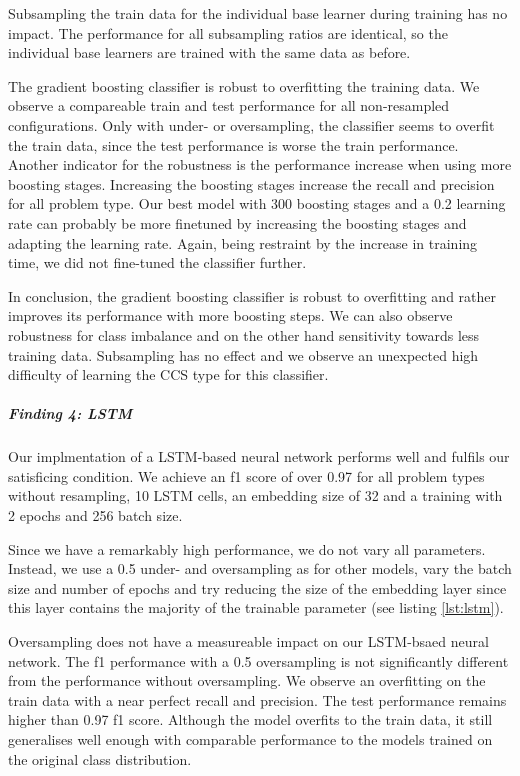 Subsampling the train data for the individual base learner during training has no impact. The performance for all subsampling ratios are identical, so the individual base learners are trained with the same data as before.

The gradient boosting classifier is robust to overfitting the training data. We observe a compareable train and test performance for all non-resampled configurations. Only with under- or oversampling, the classifier seems to overfit the train data, since the test performance is worse the train performance. 
Another indicator for the robustness is the performance increase when using more boosting stages. Increasing the boosting stages increase the recall and precision for all problem type. Our best model with 300 boosting stages and a 0.2 learning rate can probably be more finetuned by increasing the boosting stages and adapting the learning rate. Again, being restraint by the increase in training time, we did not fine-tuned the classifier further.

In conclusion, the gradient boosting classifier is robust to overfitting and rather improves its performance with more boosting steps. We can also observe robustness for class imbalance and on the other hand sensitivity towards less training data. Subsampling has no effect and we observe an unexpected high difficulty of learning the CCS type for this classifier.


\subparagraph{Finding 4: LSTM}
Our implmentation of a LSTM-based neural network performs well and fulfils our satisficing condition. We achieve an f1 score of over 0.97 for all problem types without resampling, 10 LSTM cells, an embedding size of 32 and a training with 2 epochs and 256 batch size. 


Since we have a remarkably high performance, we do not vary all parameters. Instead, we use a 0.5 under- and oversampling as for other models, vary the batch size and number of epochs and try reducing the size of the embedding layer since this layer contains the majority of the trainable parameter (see listing \ref{lst:lstm}).


Oversampling does not have a measureable impact on our LSTM-bsaed neural network. The f1 performance with a 0.5 oversampling is not significantly different from the performance without oversampling. We observe an overfitting on the train data with a near perfect recall and precision. The test performance remains higher than 0.97 f1 score. Although the model overfits to the train data, it still generalises well enough with comparable performance to the models trained on the original class distribution.


